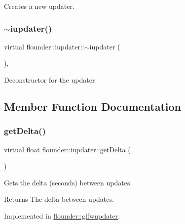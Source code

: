Creates a new updater. 

\mbox{\label{classflounder_1_1iupdater_a70569371d9b898b7d30442a4463fbee4}} 
\subsubsection{\texorpdfstring{$\sim$iupdater()}{~iupdater()}}
{\footnotesize\ttfamily virtual flounder\+::iupdater\+::$\sim$iupdater (\begin{DoxyParamCaption}{ }\end{DoxyParamCaption})\hspace{0.3cm}{\ttfamily [inline]}, {\ttfamily [virtual]}}



Deconstructor for the updater. 



\subsection{Member Function Documentation}
\mbox{\label{classflounder_1_1iupdater_a1a3813366f3a4f08cb91e23cd7b63cda}} 
\subsubsection{\texorpdfstring{get\+Delta()}{getDelta()}}
{\footnotesize\ttfamily virtual float flounder\+::iupdater\+::get\+Delta (\begin{DoxyParamCaption}{ }\end{DoxyParamCaption})\hspace{0.3cm}{\ttfamily [pure virtual]}}



Gets the delta (seconds) between updates. 

\begin{DoxyReturn}{Returns}
The delta between updates. 
\end{DoxyReturn}


Implemented in \hyperlink{classflounder_1_1glfwupdater_adfe51aba1c2ac7c79d385eed15c901fc}{flounder\+::glfwupdater}.

